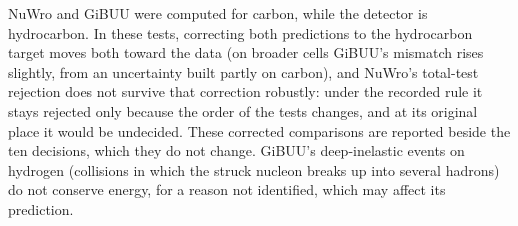 
NuWro and GiBUU were computed for carbon, while the detector is hydrocarbon. In these tests, correcting both predictions to the hydrocarbon target moves both toward the data (on broader cells GiBUU's mismatch rises slightly, from an uncertainty built partly on carbon), and NuWro's total-test rejection does not survive that correction robustly: under the recorded rule it stays rejected only because the order of the tests changes, and at its original place it would be undecided. These corrected comparisons are reported beside the ten decisions, which they do not change. GiBUU's deep-inelastic events on hydrogen (collisions in which the struck nucleon breaks up into several hadrons) do not conserve energy, for a reason not identified, which may affect its prediction.

